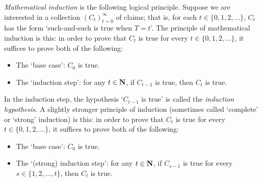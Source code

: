 \documentclass[11pt,letterpaper,reqno,oneside]{book}
\begin{document}
\begin{appendices}
\emph{Mathematical induction} is the following logical principle. Suppose we are interested in a collection $(C_t)_{t=0}^\infty$ of claims; that is, for each $t \in \{0,1,2,\dots\}$, $C_t$ has the form `such-and-such is true when $T=t$'. The principle of mathematical induction is this: in order to prove that $C_t$ is true for every $t \in \{0,1,2,\dots\}$, it suffices to prove both of the following:

\begin{itemize}

	\item The `base case': $C_0$ is true.

	\item The `induction step': for any $t \in \mathbf{N}$, if $C_{t-1}$ is true, then $C_t$ is true.

\end{itemize}
%
In the induction step, the hypothesis `$C_{t-1}$ is true' is called the \emph{induction hypothesis.}
A slightly stronger principle of induction (sometimes called `complete' or `strong' induction) is this: in order to prove that $C_t$ is true for every $t \in \{0,1,2,\dots\}$, it suffices to prove both of the following:

\begin{itemize}

	\item The `base case': $C_0$ is true.

	\item The `(strong) induction step': for any $t \in \mathbf{N}$, if $C_{s-1}$ is true for every $s \in \{1,2,\dots,t\}$, then $C_t$ is true.

\end{itemize}



\end{appendices}








\printbibliography[heading=bibintoc]



\end{document}
